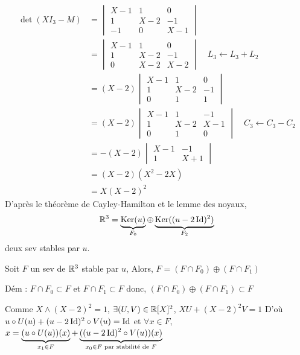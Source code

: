 \begin{solution}
\begin{align*}
\det(X I_3 - M) &= \begin{vmatrix} X-1 & 1 & 0 \\ 1 & X-2 & -1 \\ -1 & 0 & X-1 \end{vmatrix} \\
&= \begin{vmatrix} X-1 & 1 & 0 \\ 1 & X-2 & -1 \\ 0 & X-2 & X-2 \end{vmatrix} \quad L_3 \leftarrow L_3 + L_2 \\
&= (X-2) \begin{vmatrix} X-1 & 1 & 0 \\ 1 & X-2 & -1 \\ 0 & 1 & 1 \end{vmatrix} \\
&= (X-2) \begin{vmatrix} X-1 & 1 & -1 \\ 1 & X-2 & X-1 \\ 0 & 1 & 0 \end{vmatrix} \quad C_3 \leftarrow C_3 - C_2 \\
&= -(X-2) \begin{vmatrix} X-1 & -1 \\ 1 & X+1 \end{vmatrix} \\
&= (X-2) (X^2 - 2X) \\
&= X (X-2)^2
\end{align*}
D'après le théorème de Cayley-Hamilton et le lemme des noyaux,
\[
\mathbb R^3 = \underbrace{\operatorname{Ker}(u)}_{F_0} \oplus \underbrace{\operatorname{Ker}((u-2\operatorname{Id})^2)}_{F_2}
\]
deux sev stables par $u$.

\begin{lemma*}
Soit $F$ un sev de $\mathbb R^3$ stable par $u$,
Alors, $F = (F \cap F_0) \oplus (F \cap F_1)$
\end{lemma*}

Dém : $F \cap F_0 \subset F$ et $F \cap F_1 \subset F$ donc,
$(F \cap F_0) \oplus (F \cap F_1) \subset F$

Comme $X \land (X-2)^2 = 1$, $\exists (U,V) \in \mathbb R[X]^2$,
$XU + (X-2)^2V = 1$
D'où $u \circ U(u) + (u-2\operatorname{Id})^2 \circ V(u) = \operatorname{Id}$
et $\forall x \in F$, $x = \underbrace{(u \circ U(u))(x)}_{x_1 \in F} + \underbrace{((u-2\operatorname{Id})^2 \circ V(u))(x)}_{x_0 \in F \text{ par stabilité de } F}$


\end{solution}
